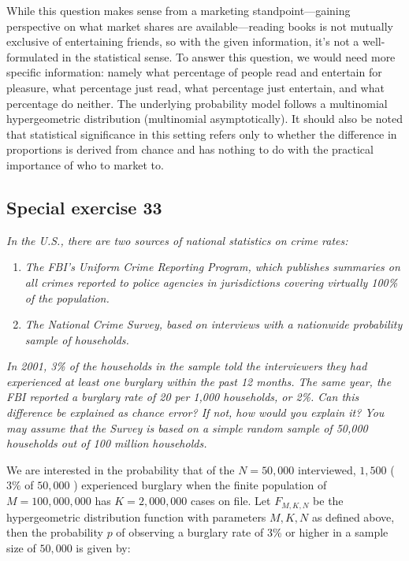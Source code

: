 \documentclass[11pt]{article}
\begin{document}
\vspace{5mm}

While this question makes sense from a marketing standpoint---gaining perspective on what market shares are available---reading books is not mutually exclusive of entertaining friends, so with the given information, it's not a well-formulated in the statistical sense.  To answer this question, we would need more specific information: namely what percentage of people read and entertain for pleasure, what percentage just read, what percentage just entertain, and what percentage do neither.  The underlying probability model follows a multinomial hypergeometric distribution (multinomial asymptotically).  It should also be noted that statistical significance in this setting refers only to whether the difference in proportions is derived from chance and has nothing to do with the practical importance of who to market to.


\subsection*{Special exercise 33} %
\textit{In the U.S., there are two sources of national statistics on crime rates:}
\begin{enumerate}[i]
	\item \textit{The FBI's Uniform Crime Reporting Program, which publishes summaries on all crimes reported to police agencies in jurisdictions covering virtually 100\% of the population.}
	\item \textit{The National Crime Survey, based on interviews with a nationwide probability sample of households.}
\end{enumerate}

\textit{In 2001, 3\% of the households in the sample told the interviewers they had experienced at least one burglary within the past 12 months.
The same year, the FBI reported a burglary rate of 20 per 1,000 households, or 2\%.
Can this difference be explained as chance error?
If not, how would you explain it?
You may assume that the Survey is based on a simple random sample of 50,000 households out of 100 million households.}

\vspace{5mm}

We are interested in the probability that of the $ N = 50,000 $ interviewed, $ 1,500 $ ($ 3\% $ of $ 50,000 $ ) experienced burglary when the finite population of $ M = 100,000,000 $ has $ K = 2,000,000 $ cases on file.  Let $ F_{M, K, N} $ be the hypergeometric distribution function with parameters $ M,K,N $ as defined above, then the probability $ p $ of observing a burglary rate of 3\% or higher in a sample size of $ 50,000 $ is given by:
\end{document}
